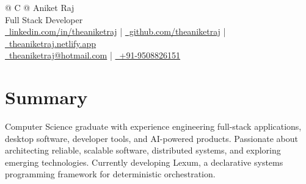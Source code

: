 \documentclass[a4paper,11pt]{article}
\begin{document}
\pagestyle{empty}



\begin{tabularx}{\linewidth}{@{} C @{}}
	\Huge{Aniket Raj}                                                  \\[4.5pt]
	\normalsize Full Stack Developer \\[3.5pt]
	\href{https://linkedin.com/in/theaniketraj}{\faLinkedin\ linkedin.com/in/theaniketraj} \quad | \quad
	\href{https://github.com/theaniketraj}{\faGithub\ github.com/theaniketraj} \quad | \quad
	\href{https://theaniketraj.netlify.app}{\faGlobe\ theaniketraj.netlify.app} \\[4pt]
	\href{mailto:theaniketraj@hotmail.com}{\faEnvelope\ theaniketraj@hotmail.com} \quad | \quad
	\href{tel:+919508826151}{\faMobile\ +91-9508826151}
\end{tabularx}


\section{Summary}
Computer Science graduate with experience engineering full-stack applications, desktop software, developer tools, and AI-powered products. Passionate about architecting reliable, scalable software, distributed systems, and exploring emerging technologies. Currently developing Lexum, a declarative systems programming framework for deterministic orchestration.

\end{document}
